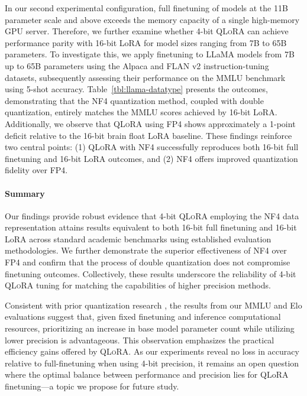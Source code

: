 In our second experimental configuration, full finetuning of models at the 11B parameter scale and above exceeds the memory capacity of a single high-memory GPU server. Therefore, we further examine whether 4-bit \textsc{QLoRA} can achieve performance parity with 16-bit LoRA for model sizes ranging from 7B to 65B parameters. To investigate this, we apply finetuning to LLaMA models from 7B up to 65B parameters using the Alpaca and FLAN v2 instruction-tuning datasets, subsequently assessing their performance on the MMLU benchmark using 5-shot accuracy. Table~\ref{tbl:llama-datatype} presents the outcomes, demonstrating that the NF4 quantization method, coupled with double quantization, entirely matches the MMLU scores achieved by 16-bit LoRA. Additionally, we observe that \textsc{QLoRA} using FP4 shows approximately a 1-point deficit relative to the 16-bit brain float LoRA baseline. These findings reinforce two central points: (1) \textsc{QLoRA} with NF4 successfully reproduces both 16-bit full finetuning and 16-bit LoRA outcomes, and (2) NF4 offers improved quantization fidelity over FP4.

\paragraph{Summary} Our findings provide robust evidence that 4-bit \textsc{QLoRA} employing the NF4 data representation attains results equivalent to both 16-bit full finetuning and 16-bit LoRA across standard academic benchmarks using established evaluation methodologies. We further demonstrate the superior effectiveness of NF4 over FP4 and confirm that the process of double quantization does not compromise finetuning outcomes. Collectively, these results underscore the reliability of 4-bit \textsc{QLoRA} tuning for matching the capabilities of higher precision methods.

Consistent with prior quantization research \citep{dettmers2022case}, the results from our MMLU and Elo evaluations suggest that, given fixed finetuning and inference computational resources, prioritizing an increase in base model parameter count while utilizing lower precision is advantageous. This observation emphasizes the practical efficiency gains offered by \textsc{QLoRA}. As our experiments reveal no loss in accuracy relative to full-finetuning when using 4-bit precision, it remains an open question where the optimal balance between performance and precision lies for QLoRA finetuning—a topic we propose for future study.

